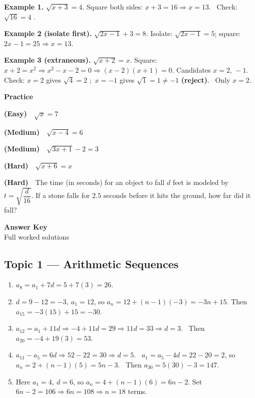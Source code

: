 \documentclass[11pt]{article}
\newcommand{\easy}{{\small\color{FangGreen}\textbf{(Easy)}}}
\newcommand{\med}{{\small\color{FangOrange}\textbf{(Medium)}}}
\newcommand{\hard}{{\small\color{FangAccent}\textbf{(Hard)}}}
\begin{document}
\begin{example}
\textbf{Example 1.} $\sqrt{x+3} = 4$. Square both sides: $x + 3 = 16 \Rightarrow x = 13.$
\ Check: $\sqrt{16} = 4$ \checkmark.

\smallskip
\textbf{Example 2 (isolate first).} $\sqrt{2x-1} + 3 = 8$. Isolate: $\sqrt{2x-1} = 5$; square:
$2x - 1 = 25 \Rightarrow x = 13.$

\smallskip
\textbf{Example 3 (extraneous).} $\sqrt{x+2} = x$. Square: $x + 2 = x^{2} \Rightarrow x^{2} - x - 2 = 0
\Rightarrow (x-2)(x+1) = 0.$ Candidates $x = 2,\,-1$. Check: $x=2$ gives $\sqrt{4}=2$ \checkmark;\
$x=-1$ gives $\sqrt{1}=1 \neq -1$ \textbf{\color{FangAccent}(reject)}. \ Only $x = 2.$
\end{example}

\textbf{Practice}
\begin{practice}
  \item \easy\ \ $\sqrt{x} = 7$
  \item \med\ \ $\sqrt{x - 4} = 6$
  \item \med\ \ $\sqrt{3x + 1} - 2 = 3$
  \item \hard\ \ $\sqrt{x + 6} = x$
  \item \hard\ \ The time (in seconds) for an object to fall $d$ feet is modeled by $t = \sqrt{\dfrac{d}{16}}$.
        If a stone falls for $2.5$ seconds before it hits the ground, how far did it fall?
\end{practice}

\clearpage
\begin{center}
  {\color{FangAccent}\Huge\bfseries Answer Key}\\[2pt]
  {\small\color{RuleGray}Full worked solutions}
\end{center}
\vspace{4pt}

\subsection*{\color{FangBlue}Topic 1 --- Arithmetic Sequences}
\begin{enumerate}[leftmargin=2em,itemsep=6pt]
  \item $a_8 = a_1 + 7d = 5 + 7(3) = \boxed{26}.$
  \item $d = 9 - 12 = -3,\ a_1 = 12$, so $a_n = 12 + (n-1)(-3) = \boxed{-3n + 15}.$
        Then $a_{15} = -3(15)+15 = \boxed{-30}.$
  \item $a_{12} = a_1 + 11d \Rightarrow -4 + 11d = 29 \Rightarrow 11d = 33 \Rightarrow \boxed{d = 3}.$
        \ Then $a_{20} = -4 + 19(3) = \boxed{53}.$
  \item $a_{11} - a_5 = 6d \Rightarrow 52 - 22 = 30 \Rightarrow d = 5.$
        \ $a_1 = a_5 - 4d = 22 - 20 = 2$, so $a_n = 2 + (n-1)(5) = \boxed{5n - 3}.$
        \ Then $a_{30} = 5(30) - 3 = \boxed{147}.$
  \item Here $a_1 = 4,\ d = 6$, so $a_n = 4 + (n-1)(6) = 6n - 2.$
        Set $6n - 2 = 106 \Rightarrow 6n = 108 \Rightarrow n = \boxed{18}$ terms.
\end{enumerate}
\end{document}
